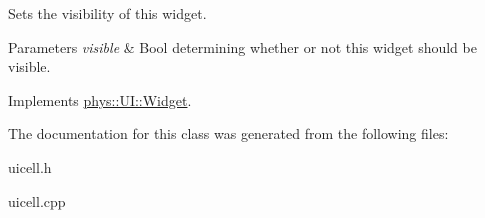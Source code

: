 Sets the visibility of this widget. 


\begin{DoxyParams}{Parameters}
{\em visible} & Bool determining whether or not this widget should be visible. \\
\hline
\end{DoxyParams}


Implements \hyperlink{classphys_1_1UI_1_1Widget_ab049233d8d5522a6ab42654b8924a3e0}{phys::UI::Widget}.



The documentation for this class was generated from the following files:\begin{DoxyCompactItemize}
\item 
uicell.h\item 
uicell.cpp\end{DoxyCompactItemize}
